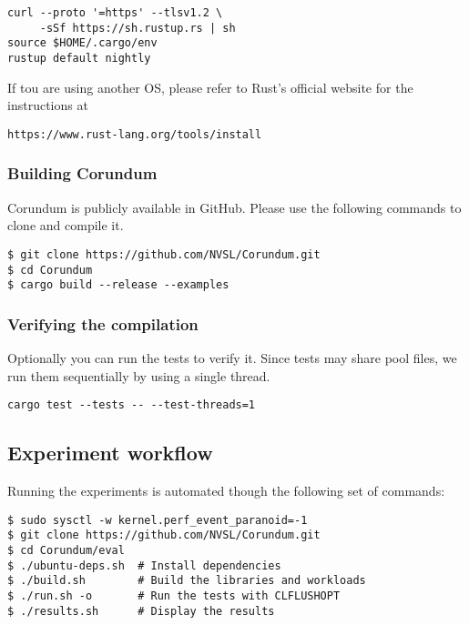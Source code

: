 {\begin{verbatim}
curl --proto '=https' --tlsv1.2 \
     -sSf https://sh.rustup.rs | sh
source $HOME/.cargo/env
rustup default nightly
\end{verbatim}

If tou are using
another OS, please refer to Rust's official website
for the instructions at
\begin{center}
  \verb+https://www.rust-lang.org/tools/install+
\end{center}

\subsubsection{Building Corundum}

Corundum is publicly available in GitHub. Please use
the following commands to clone and compile it.

\begin{verbatim}
$ git clone https://github.com/NVSL/Corundum.git
$ cd Corundum
$ cargo build --release --examples
\end{verbatim}

\subsubsection{Verifying the compilation}

Optionally you can run the tests to verify it.
Since tests may share pool files, we run them sequentially
by using a single thread.

\begin{verbatim}
cargo test --tests -- --test-threads=1 
\end{verbatim}

\subsection{Experiment workflow}

Running the experiments is automated though the following set of commands:

\begin{verbatim}
$ sudo sysctl -w kernel.perf_event_paranoid=-1
$ git clone https://github.com/NVSL/Corundum.git
$ cd Corundum/eval
$ ./ubuntu-deps.sh  # Install dependencies
$ ./build.sh        # Build the libraries and workloads
$ ./run.sh -o       # Run the tests with CLFLUSHOPT
$ ./results.sh      # Display the results
\end{verbatim}

}
